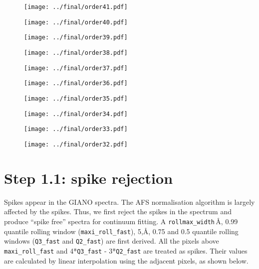 \documentclass{article}
\begin{document}
\begin{figure}[H]
    \centering
    \texttt{[image: ../final/order41.pdf]}
\end{figure}
\begin{figure}[H]
    \centering
    \texttt{[image: ../final/order40.pdf]}
\end{figure}
\begin{figure}[H]
    \centering
    \texttt{[image: ../final/order39.pdf]}
\end{figure}
\begin{figure}[H]
    \centering
    \texttt{[image: ../final/order38.pdf]}
\end{figure}
\begin{figure}[H]
    \centering
    \texttt{[image: ../final/order37.pdf]}
\end{figure}
\begin{figure}[H]
    \centering
    \texttt{[image: ../final/order36.pdf]}
\end{figure}
\begin{figure}[H]
    \centering
    \texttt{[image: ../final/order35.pdf]}
\end{figure}
\begin{figure}[H]
    \centering
    \texttt{[image: ../final/order34.pdf]}
\end{figure}
\begin{figure}[H]
    \centering
    \texttt{[image: ../final/order33.pdf]}
\end{figure}
\begin{figure}[H]
    \centering
    \texttt{[image: ../final/order32.pdf]}
\end{figure}

\newpage

\section{Step 1.1: spike rejection}

Spikes appear in the GIANO spectra.
The AFS normalisation algorithm is largely affected by the spikes. 
Thus, we first reject the spikes in the spectrum and produce ``spike free'' spectra for continuum fitting.
A \texttt{rollmax\_width}\,\r{A}, 0.99 quantile rolling window (\texttt{maxi\_roll\_fast}), 5,\r{A}, 0.75 and 0.5 quantile rolling windows (\texttt{Q3\_fast} and \texttt{Q2\_fast}) are  first derived. 
All the pixels above \texttt{maxi\_roll\_fast} and 4*\texttt{Q3\_fast} - 3*\texttt{Q2\_fast} are treated as spikes. 
Their values are calculated by linear interpolation using the adjacent pixels, as shown below.
\end{document}
